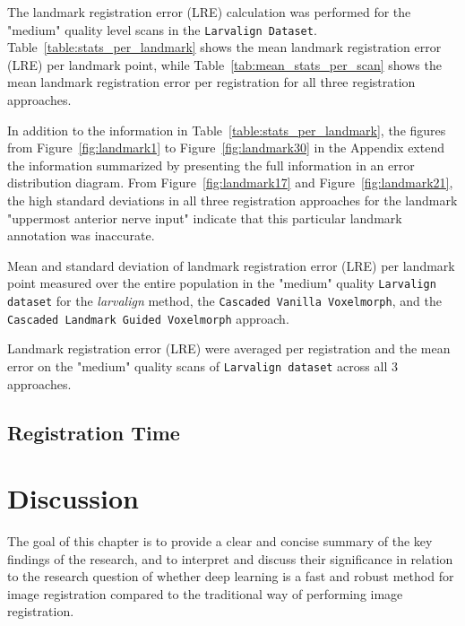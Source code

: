 \documentclass{book}
\begin{document}
	The landmark registration error (LRE) calculation was performed for the "medium" quality level scans in the \texttt{Larvalign Dataset}. Table~\ref{table:stats_per_landmark} shows the mean landmark registration error (LRE) per landmark point, while Table~\ref{tab:mean_stats_per_scan} shows the mean landmark registration error per registration for all three registration approaches.
	
	In addition to the information in Table~\ref{table:stats_per_landmark}, the figures from Figure~\ref{fig:landmark1} to Figure~\ref{fig:landmark30} in the Appendix extend the information summarized by presenting the full information in an error distribution diagram. From Figure~\ref{fig:landmark17} and Figure~\ref{fig:landmark21}, the high standard deviations in all three registration approaches for the landmark "uppermost anterior nerve input" indicate that this particular landmark annotation was inaccurate.
	
	\begin{table}[h]
		\centering
		
		\caption{Mean and standard deviation of landmark registration error (LRE) per landmark point measured over the entire population in the "medium" quality \texttt{Larvalign dataset} for the \textit{larvalign} method, the \texttt{Cascaded Vanilla Voxelmorph}, and the \texttt{Cascaded Landmark Guided Voxelmorph} approach.}
		\label{table:stats_per_landmark}
	\end{table}	

	\begin{table}[h!]
		\centering
		
		\caption{Landmark registration error (LRE) were averaged per registration and the mean error on the "medium" quality scans of \texttt{Larvalign dataset} across all 3 approaches.}
		\label{tab:mean_stats_per_scan}
	\end{table}

	\section{Registration Time} \label{sec:RegTime}
	
	\chapter{Discussion}
	The goal of this chapter is to provide a clear and concise summary of the key findings of the research, and to interpret and discuss their significance in relation to the research question of whether deep learning is a fast and robust method for image registration compared to the traditional way of performing image registration.
	
\end{document}
